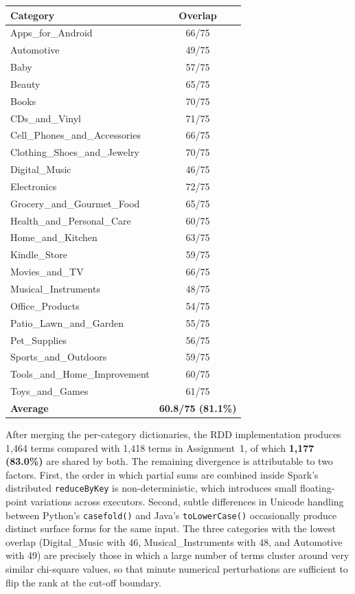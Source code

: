 \documentclass[11pt,a4paper]{extarticle}
\begin{document}
\begin{center}
\begin{tabular}{lc}
\toprule
\textbf{Category} & \textbf{Overlap} \\
\midrule
Apps\_for\_Android            & 66/75 \\
Automotive                    & 49/75 \\
Baby                          & 57/75 \\
Beauty                        & 65/75 \\
Books                         & 70/75 \\
CDs\_and\_Vinyl               & 71/75 \\
Cell\_Phones\_and\_Accessories & 66/75 \\
Clothing\_Shoes\_and\_Jewelry & 70/75 \\
Digital\_Music                & 46/75 \\
Electronics                   & 72/75 \\
Grocery\_and\_Gourmet\_Food   & 65/75 \\
Health\_and\_Personal\_Care   & 60/75 \\
Home\_and\_Kitchen            & 63/75 \\
Kindle\_Store                 & 59/75 \\
Movies\_and\_TV               & 66/75 \\
Musical\_Instruments          & 48/75 \\
Office\_Products              & 54/75 \\
Patio\_Lawn\_and\_Garden      & 55/75 \\
Pet\_Supplies                 & 56/75 \\
Sports\_and\_Outdoors         & 59/75 \\
Tools\_and\_Home\_Improvement & 60/75 \\
Toys\_and\_Games              & 61/75 \\
\textbf{Average}              & \textbf{60.8/75 (81.1\%)} \\
\bottomrule
\end{tabular}
\end{center}

\vspace{0.5em}
After merging the per-category dictionaries, the RDD implementation produces 1{,}464 terms compared with 1{,}418 terms in Assignment~1, of which \textbf{1{,}177 (83.0\%)} are shared by both. The remaining divergence is attributable to two factors. First, the order in which partial sums are combined inside Spark's distributed \texttt{reduceByKey} is non-deterministic, which introduces small floating-point variations across executors. Second, subtle differences in Unicode handling between Python's \texttt{casefold()} and Java's \texttt{toLowerCase()} occasionally produce distinct surface forms for the same input. The three categories with the lowest overlap (Digital\_Music with 46, Musical\_Instruments with 48, and Automotive with 49) are precisely those in which a large number of terms cluster around very similar chi-square values, so that minute numerical perturbations are sufficient to flip the rank at the cut-off boundary.
\end{document}
